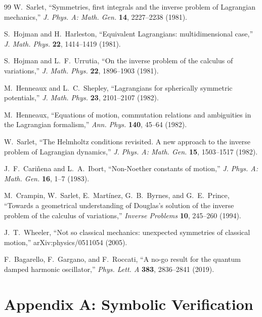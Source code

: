 \documentclass[11pt]{article}
\theoremstyle{remark}
\begin{document}
\begin{thebibliography}{99}
 W.~Sarlet, ``Symmetries, first integrals and the inverse problem of Lagrangian mechanics,'' \emph{J. Phys. A: Math. Gen.} \textbf{14}, 2227--2238 (1981).

 S.~Hojman and H.~Harleston, ``Equivalent Lagrangians: multidimensional case,'' \emph{J. Math. Phys.} \textbf{22}, 1414--1419 (1981).

 S.~Hojman and L.~F.~Urrutia, ``On the inverse problem of the calculus of variations,'' \emph{J. Math. Phys.} \textbf{22}, 1896--1903 (1981).

 M.~Henneaux and L.~C.~Shepley, ``Lagrangians for spherically symmetric potentials,'' \emph{J. Math. Phys.} \textbf{23}, 2101--2107 (1982).

 M.~Henneaux, ``Equations of motion, commutation relations and ambiguities in the Lagrangian formalism,'' \emph{Ann. Phys.} \textbf{140}, 45--64 (1982).

 W.~Sarlet, ``The Helmholtz conditions revisited. A new approach to the inverse problem of Lagrangian dynamics,'' \emph{J. Phys. A: Math. Gen.} \textbf{15}, 1503--1517 (1982).

 J.~F.~Cari\~nena and L.~A.~Ibort, ``Non-Noether constants of motion,'' \emph{J. Phys. A: Math. Gen.} \textbf{16}, 1--7 (1983).

 M.~Crampin, W.~Sarlet, E.~Mart\'inez, G.~B.~Byrnes, and G.~E.~Prince, ``Towards a geometrical understanding of Douglas's solution of the inverse problem of the calculus of variations,'' \emph{Inverse Problems} \textbf{10}, 245--260 (1994).

 J.~T.~Wheeler, ``Not so classical mechanics: unexpected symmetries of classical motion,'' arXiv:physics/0511054 (2005).

 F.~Bagarello, F.~Gargano, and F.~Roccati, ``A no-go result for the quantum damped harmonic oscillator,'' \emph{Phys. Lett. A} \textbf{383}, 2836--2841 (2019).

\end{thebibliography}

\newpage
\appendix
\section*{Appendix A: Symbolic Verification}
\end{document}
